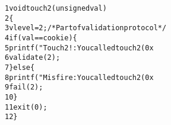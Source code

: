 \begin{alltt}
{\scriptsize   1} void touch2(unsigned val)
{\scriptsize   2} \verb:{:
{\scriptsize   3}     vlevel = 2;       /* Part of validation protocol */
{\scriptsize   4}     if (val == cookie) \verb:{:
{\scriptsize   5}         printf("Touch2!: You called touch2(0x%.8x)\verb:\n:", val);
{\scriptsize   6}         validate(2);
{\scriptsize   7}     \verb:}: else \verb:{:
{\scriptsize   8}         printf("Misfire: You called touch2(0x%.8x)\verb:\n:", val);
{\scriptsize   9}         fail(2);
{\scriptsize  10}     \verb:}:
{\scriptsize  11}     exit(0);
{\scriptsize  12} \verb:}:
\end{alltt}
